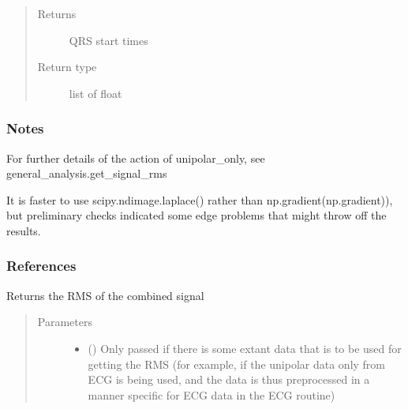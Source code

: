 \documentclass[letterpaper,10pt,english]{sphinxmanual}
\begin{document}
\begin{fulllineitems}
\begin{fulllineitems}
\begin{quote}
\begin{description}
\item[{Returns}] \leavevmode
\sphinxAtStartPar
{} \textendash{} QRS start times

\item[{Return type}] \leavevmode
\sphinxAtStartPar
list of float

\end{description}\end{quote}
\subsubsection*{Notes}

\sphinxAtStartPar
For further details of the action of unipolar\_only, see general\_analysis.get\_signal\_rms

\sphinxAtStartPar
It is faster to use scipy.ndimage.laplace() rather than np.gradient(np.gradient)), but preliminary checks
indicated some edge problems that might throw off the results.
\subsubsection*{References}

\end{fulllineitems}


\begin{fulllineitems}
\label{\detokenize{_autosummary/signalanalysis.ecg.Ecg:signalanalysis.ecg.Ecg.get_rms}}
\sphinxAtStartPar
Returns the RMS of the combined signal
\begin{quote}\begin{description}
\item[{Parameters}] \leavevmode\begin{itemize}
\item {} 
\sphinxAtStartPar
{} (\sphinxstyleliteralemphasis{\sphinxupquote{, }}) \textendash{} Only passed if there is some extant data that is to be used for getting the RMS (for example,
if the unipolar data only from ECG is being used, and the data is thus preprocessed in a manner specific
for ECG data in the ECG routine)


\end{itemize}
\end{description}
\end{quote}
\end{fulllineitems}
\end{fulllineitems}
\end{document}
